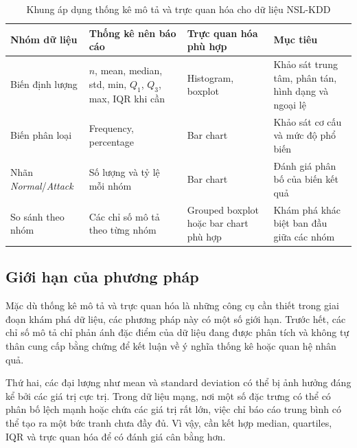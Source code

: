 \documentclass[../main.tex]{subfiles}
\begin{document}
\begin{table}[H]
    \centering
    \caption{Khung áp dụng thống kê mô tả và trực quan hóa cho dữ liệu NSL-KDD}
    \label{tab:t1:nslkdd}
    \renewcommand{\arraystretch}{1.2}
    \begin{tabularx}{\textwidth}{|p{}|p{}|p{}|X|}
        \hline
        \textbf{Nhóm dữ liệu} &
        \textbf{Thống kê nên báo cáo} &
        \textbf{Trực quan hóa phù hợp} &
        \textbf{Mục tiêu} \\
        \hline

        Biến định lượng &
        $n$, mean, median, std, min, $Q_1$, $Q_3$, max, IQR khi cần &
        Histogram, boxplot &
        Khảo sát trung tâm, phân tán, hình dạng và ngoại lệ \\
        \hline

        Biến phân loại &
        Frequency, percentage &
        Bar chart &
        Khảo sát cơ cấu và mức độ phổ biến \\
        \hline

        Nhãn \textit{Normal}/\allowbreak\textit{Attack} &
        Số lượng và tỷ lệ mỗi nhóm &
        Bar chart &
        Đánh giá phân bố của biến kết quả \\
        \hline

        So sánh theo nhóm &
        Các chỉ số mô tả theo từng nhóm &
        Grouped boxplot hoặc bar chart phù hợp &
        Khám phá khác biệt ban đầu giữa các nhóm \\
        \hline
    \end{tabularx}
\end{table}

\subsection{Giới hạn của phương pháp}

Mặc dù thống kê mô tả và trực quan hóa là những công cụ cần thiết trong giai đoạn khám phá dữ liệu, các phương pháp này có một số giới hạn. Trước hết, các chỉ số mô tả chỉ phản ánh đặc điểm của dữ liệu đang được phân tích và không tự thân cung cấp bằng chứng để kết luận về ý nghĩa thống kê hoặc quan hệ nhân quả.

Thứ hai, các đại lượng như mean và standard deviation có thể bị ảnh hưởng đáng kể bởi các giá trị cực trị. Trong dữ liệu mạng, nơi một số đặc trưng có thể có phân bố lệch mạnh hoặc chứa các giá trị rất lớn, việc chỉ báo cáo trung bình có thể tạo ra một bức tranh chưa đầy đủ. Vì vậy, cần kết hợp median, quartiles, IQR và trực quan hóa để có đánh giá cân bằng hơn.
\end{document}
